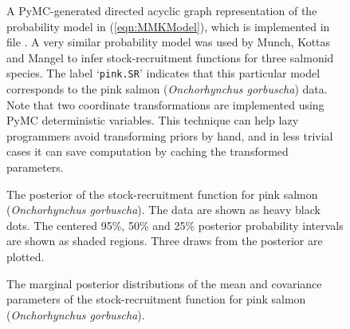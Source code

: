 \begin{figure}
    \centering
    \caption{A PyMC-generated directed acyclic graph representation of the probability model in (\ref{eqn:MMKModel}), which is implemented in file . A very similar probability model was used by Munch, Kottas and Mangel to infer stock-recruitment functions for three salmonid species. The label `\texttt{pink.SR}' indicates that this particular model corresponds to the pink salmon (\emph{Onchorhynchus gorbuscha}) data. Note that two coordinate transformations are implemented using PyMC deterministic variables. This technique can help lazy programmers avoid transforming priors by hand, and in less trivial cases it can save computation by caching the transformed parameters.}
    \label{fig:MMKsalmonmodel}
\end{figure}

\begin{figure}
    \centering
    \caption{The posterior of the stock-recruitment function for pink salmon (\emph{Onchorhynchus gorbuscha}). The data are shown as heavy black dots. The centered 95\%, 50\% and 25\% posterior probability intervals are shown as shaded regions. Three draws from the posterior are plotted.}
    \label{fig:pinkfpost}
\end{figure}

\begin{figure}
    \centering
    \caption{The marginal posterior distributions of the mean and covariance parameters of the stock-recruitment function for pink salmon (\emph{Onchorhynchus gorbuscha}).}
    \label{fig:pinkparams}
\end{figure}

